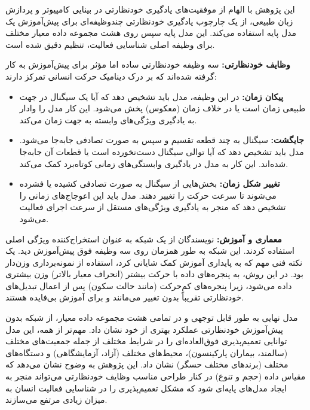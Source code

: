 این پژوهش با الهام از موفقیت‌های یادگیری خودنظارتی در بینایی کامپیوتر و پردازش زبان طبیعی، از یک چارچوب یادگیری خودنظارتی چندوظیفه‌ای  برای پیش‌آموزش یک مدل پایه استفاده می‌کند. این مدل پایه سپس روی هشت مجموعه داده معیار مختلف برای وظیفه اصلی شناسایی فعالیت، تنظیم دقیق شده است.

\noindent\textbf{وظایف خودنظارتی:} سه وظیفه خودنظارتی ساده اما مؤثر برای پیش‌آموزش به کار گرفته شده‌اند که بر درک دینامیک حرکت انسانی تمرکز دارند:
\begin{itemize}
\item \textbf{پیکان زمان:} در این وظیفه، مدل باید تشخیص دهد که آیا یک سیگنال در جهت طبیعی زمان است یا در خلاف زمان (معکوس) پخش می‌شود. این کار مدل را وادار به یادگیری ویژگی‌های وابسته به جهت زمان می‌کند.
\item \textbf{جایگشت:} سیگنال به چند قطعه تقسیم و سپس به صورت تصادفی جابه‌جا می‌شود. مدل باید تشخیص دهد که آیا توالی سیگنال دست‌نخورده است یا قطعات آن جابه‌جا شده‌اند. این کار به مدل در یادگیری وابستگی‌های زمانی کوتاه‌برد کمک می‌کند.
\item \textbf{تغییر شکل زمان:} بخش‌هایی از سیگنال به صورت تصادفی کشیده یا فشرده می‌شوند تا سرعت حرکت را تغییر دهند. مدل باید این اعوجاج‌های زمانی را تشخیص دهد که منجر به یادگیری ویژگی‌های مستقل از سرعت اجرای فعالیت می‌شود.
\end{itemize}

\noindent\textbf{معماری و آموزش:} نویسندگان از یک شبکه  به عنوان استخراج‌کننده ویژگی اصلی استفاده کردند. این شبکه به طور همزمان روی سه وظیفه فوق پیش‌آموزش دید. یک نکته فنی مهم که به پایداری آموزش کمک شایانی کرد، استفاده از نمونه‌برداری وزن‌دار بود. در این روش، به پنجره‌های داده با حرکت بیشتر (انحراف معیار بالاتر) وزن بیشتری داده می‌شود، زیرا پنجره‌های کم‌حرکت (مانند حالت سکون) پس از اعمال تبدیل‌های خودنظارتی تقریباً بدون تغییر می‌مانند و برای آموزش بی‌فایده هستند.

مدل نهایی به طور قابل توجهی و در تمامی هشت مجموعه داده معیار، از شبکه  بدون پیش‌آموزش خودنظارتی عملکرد بهتری از خود نشان داد. مهم‌تر از همه، این مدل توانایی تعمیم‌پذیری فوق‌العاده‌ای را در شرایط مختلف از جمله جمعیت‌های مختلف (سالمند، بیماران پارکینسون)، محیط‌های مختلف (آزاد، آزمایشگاهی) و دستگاه‌های مختلف  (برندهای مختلف حسگر) نشان داد. این پژوهش به وضوح نشان می‌دهد که مقیاس داده (حجم و تنوع) در کنار طراحی مناسب وظایف خودنظارتی می‌تواند منجر به ایجاد مدل‌های پایه‌ای شود که مشکل تعمیم‌پذیری را در شناسایی فعالیت انسان به میزان زیادی مرتفع می‌سازند.


